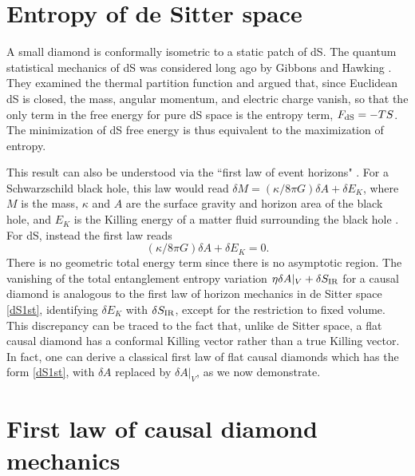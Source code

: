 \documentclass[aps,prd,showpacs,groupedaddress,nofootinbib,longbibliography,12pt]{revtex4-1}
\def\beq{\begin{equation}}
\def\eeq{\end{equation}}
\def\d{\delta}\def\D{\Delta}
\def\k{\kappa}
\begin{document}
\section{Entropy of de Sitter space}
\label{AppC}

A small diamond %
is conformally isometric to a static patch of dS. %
The quantum statistical mechanics of dS was considered long ago by 
Gibbons and Hawking \cite{Gibbons:1976ue}. They examined the thermal partition function and argued that, since Euclidean dS is closed, the mass, angular momentum, and electric charge vanish, so that the only term in the free energy for pure dS space is the entropy term, $F_{\rm dS}=-TS$. The minimization of dS free energy is thus equivalent to the maximization of entropy. %

This result can also be understood via the ``first law of event horizons" \cite{Gibbons:1977mu}.
For a Schwarzschild black hole, this law would read $\d M = (\k/8\pi G)\d A + \d E_K$, where  $M$ is the mass, 
$\k$ and $A$ are the surface gravity and horizon area of the black hole, and $E_K$ is the Killing energy of a matter fluid 
surrounding the black hole \cite{Bardeen:1973gs}. 
For dS, instead the first law reads
%
\beq\label{dS1st}
(\k/8\pi G)\d A + \d E_K=0.
\eeq
% 
There is no geometric total energy term since there is no asymptotic region. 
The vanishing of the 
total entanglement entropy variation $\eta\d A|_V + \d S_{\rm IR}$ for a causal diamond 
 is analogous to the first law of horizon mechanics 
in de Sitter space \eqref{dS1st}, identifying  $\d E_K$ with $\d S_{\rm IR}$, except for the 
restriction to fixed volume. This discrepancy can be traced to the fact that, unlike de Sitter space, 
a flat causal diamond has a conformal Killing vector rather than a true Killing vector.
In fact, one can derive a classical first law of flat causal diamonds which has the form \eqref{dS1st}, 
with $\d A$ replaced by $\d A|_V$, as we now demonstrate.


\section{First law of causal diamond mechanics}
\label{AppD}
\end{document}
